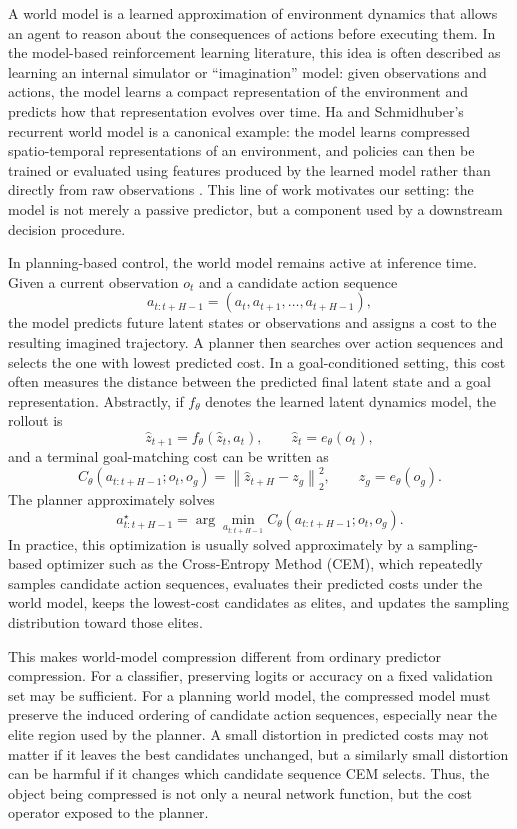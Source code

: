 \documentclass[11pt]{article}
\begin{document}
A world model is a learned approximation of environment dynamics that allows an agent to reason about the consequences of actions before executing them. In the model-based reinforcement learning literature, this idea is often described as learning an internal simulator or ``imagination'' model: given observations and actions, the model learns a compact representation of the environment and predicts how that representation evolves over time. Ha and Schmidhuber's recurrent world model is a canonical example: the model learns compressed spatio-temporal representations of an environment, and policies can then be trained or evaluated using features produced by the learned model rather than directly from raw observations \citep{ha2018worldmodels}. This line of work motivates our setting: the model is not merely a passive predictor, but a component used by a downstream decision procedure.

In planning-based control, the world model remains active at inference time. Given a current observation $o_t$ and a candidate action sequence
\[
    a_{t:t+H-1} = (a_t, a_{t+1}, \dots, a_{t+H-1}),
\]
the model predicts future latent states or observations and assigns a cost to the resulting imagined trajectory. A planner then searches over action sequences and selects the one with lowest predicted cost. In a goal-conditioned setting, this cost often measures the distance between the predicted final latent state and a goal representation. Abstractly, if $f_\theta$ denotes the learned latent dynamics model, the rollout is
\[
    \hat z_{t+1} = f_\theta(\hat z_t, a_t),
    \qquad
    \hat z_t = e_\theta(o_t),
\]
and a terminal goal-matching cost can be written as
\[
    C_\theta(a_{t:t+H-1}; o_t, o_g)
    =
    \left\lVert \hat z_{t+H} - z_g \right\rVert_2^2,
    \qquad
    z_g = e_\theta(o_g).
\]
The planner approximately solves
\[
    a_{t:t+H-1}^\star
    =
    \arg\min_{a_{t:t+H-1}}
    C_\theta(a_{t:t+H-1}; o_t, o_g).
\]
In practice, this optimization is usually solved approximately by a sampling-based optimizer such as the Cross-Entropy Method (CEM), which repeatedly samples candidate action sequences, evaluates their predicted costs under the world model, keeps the lowest-cost candidates as elites, and updates the sampling distribution toward those elites.

This makes world-model compression different from ordinary predictor compression. For a classifier, preserving logits or accuracy on a fixed validation set may be sufficient. For a planning world model, the compressed model must preserve the induced ordering of candidate action sequences, especially near the elite region used by the planner. A small distortion in predicted costs may not matter if it leaves the best candidates unchanged, but a similarly small distortion can be harmful if it changes which candidate sequence CEM selects. Thus, the object being compressed is not only a neural network function, but the cost operator exposed to the planner.
\end{document}
